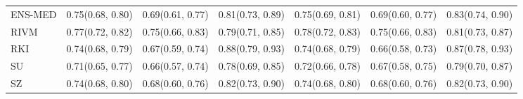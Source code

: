\begin{tabular}{l p{} p{} p{} p{} p{} p{}}
ENS-MED & {0.75\newline(0.68, 0.80)} & {0.69\newline(0.61, 0.77)} & {0.81\newline(0.73, 0.89)} & {0.75\newline(0.69, 0.81)} & {0.69\newline(0.60, 0.77)} & {0.83\newline(0.74, 0.90)} \\
RIVM & {0.77\newline(0.72, 0.82)} & {0.75\newline(0.66, 0.83)} & {0.79\newline(0.71, 0.85)} & {0.78\newline(0.72, 0.83)} & {0.75\newline(0.66, 0.83)} & {0.81\newline(0.73, 0.87)} \\
RKI & {0.74\newline(0.68, 0.79)} & {0.67\newline(0.59, 0.74)} & {0.88\newline(0.79, 0.93)} & {0.74\newline(0.68, 0.79)} & {0.66\newline(0.58, 0.73)} & {0.87\newline(0.78, 0.93)} \\
SU & {0.71\newline(0.65, 0.77)} & {0.66\newline(0.57, 0.74)} & {0.78\newline(0.69, 0.85)} & {0.72\newline(0.66, 0.78)} & {0.67\newline(0.58, 0.75)} & {0.79\newline(0.70, 0.87)} \\
SZ & {0.74\newline(0.68, 0.80)} & {0.68\newline(0.60, 0.76)} & {0.82\newline(0.73, 0.90)} & {0.74\newline(0.68, 0.80)} & {0.68\newline(0.60, 0.76)} & {0.82\newline(0.73, 0.90)} \\
\bottomrule
\end{tabular}
